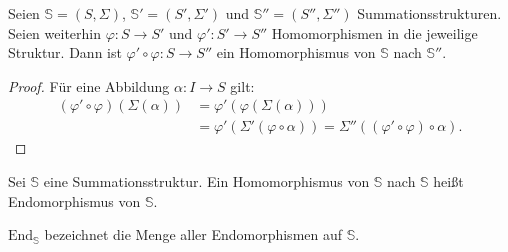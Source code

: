 \documentclass{article}
\begin{document}
\begin{theorem}
  Seien $\mathbb{S} = (S, \Sigma)$, $\mathbb{S}' = (S', \Sigma')$ und $\mathbb{S}'' = (S'', \Sigma'')$ Summationsstrukturen.
  Seien weiterhin $\varphi \colon S \to S'$ und $\varphi' \colon S' \to S''$ Homomorphismen in die jeweilige Struktur.
  Dann ist $\varphi' \circ \varphi \colon S \to S''$ ein Homomorphismus von $\mathbb{S}$ nach $\mathbb{S}''$.
\end{theorem}
\begin{proof}
  Für eine Abbildung $\alpha \colon I \to S$ gilt:
  \begin{align*}
    (\varphi' \circ \varphi)(\Sigma(\alpha)) &= \varphi'(\varphi(\Sigma(\alpha))) \\
    &= \varphi'(\Sigma'(\varphi \circ \alpha)) 
    = \Sigma''((\varphi' \circ \varphi) \circ \alpha).
  \end{align*}
\end{proof}

\begin{definition}
  Sei $\mathbb{S}$ eine Summationsstruktur. 
  Ein Homomorphismus von $\mathbb{S}$ nach $\mathbb{S}$ heißt Endomorphismus von $\mathbb{S}$.

  $\text{End}_\mathbb{S}$ bezeichnet die Menge aller Endomorphismen auf $\mathbb{S}$.
\end{definition}
\end{document}
